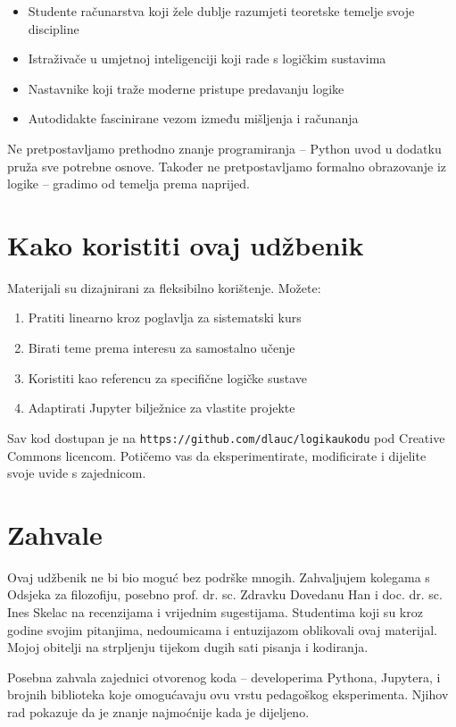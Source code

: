 \begin{itemize}
\item Studente računarstva koji žele dublje razumjeti teoretske temelje svoje discipline
\item Istraživače u umjetnoj inteligenciji koji rade s logičkim sustavima
\item Nastavnike koji traže moderne pristupe predavanju logike
\item Autodidakte fascinirane vezom između mišljenja i računanja
\end{itemize}

Ne pretpostavljamo prethodno znanje programiranja – Python uvod u dodatku pruža sve potrebne osnove.
Također ne pretpostavljamo formalno obrazovanje iz logike – gradimo od temelja prema naprijed.

\section*{Kako koristiti ovaj udžbenik}

Materijali su dizajnirani za fleksibilno korištenje. Možete:

\begin{enumerate}
\item Pratiti linearno kroz poglavlja za sistematski kurs
\item Birati teme prema interesu za samostalno učenje
\item Koristiti kao referencu za specifične logičke sustave
\item Adaptirati Jupyter bilježnice za vlastite projekte
\end{enumerate}

Sav kod dostupan je na \texttt{https://github.com/dlauc/logikaukodu} pod Creative Commons licencom. Potičemo vas da eksperimentirate, modificirate i dijelite svoje uvide s zajednicom.

\section*{Zahvale}

Ovaj udžbenik ne bi bio moguć bez podrške mnogih. Zahvaljujem kolegama s Odsjeka za filozofiju, posebno prof. dr. sc. Zdravku Dovedanu Han i doc. dr. sc. Ines Skelac na recenzijama i vrijednim sugestijama. Studentima koji su kroz godine svojim pitanjima, nedoumicama i entuzijazom oblikovali ovaj materijal. Mojoj obitelji na strpljenju tijekom dugih sati pisanja i kodiranja.

Posebna zahvala zajednici otvorenog koda – developerima Pythona, Jupytera, i brojnih biblioteka koje omogućavaju ovu vrstu pedagoškog eksperimenta. Njihov rad pokazuje da je znanje najmoćnije kada je dijeljeno.

